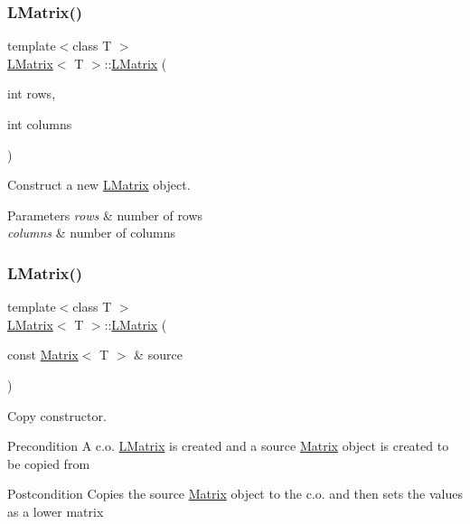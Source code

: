 \subsubsection{\texorpdfstring{LMatrix()}{LMatrix()}\hspace{0.1cm}{\footnotesize\ttfamily [2/5]}}
{\footnotesize\ttfamily template$<$class T $>$ \\
\mbox{\hyperlink{class_l_matrix}{L\+Matrix}}$<$ T $>$\+::\mbox{\hyperlink{class_l_matrix}{L\+Matrix}} (\begin{DoxyParamCaption}\item[{int}]{rows,  }\item[{int}]{columns }\end{DoxyParamCaption})}



Construct a new \mbox{\hyperlink{class_l_matrix}{L\+Matrix}} object. 


\begin{DoxyParams}{Parameters}
{\em rows} & number of rows \\
\hline
{\em columns} & number of columns \\
\hline
\end{DoxyParams}
\mbox{\label{class_l_matrix_aa4bc8aa349207a09c467d958d7361b4b}} 
\subsubsection{\texorpdfstring{LMatrix()}{LMatrix()}\hspace{0.1cm}{\footnotesize\ttfamily [3/5]}}
{\footnotesize\ttfamily template$<$class T $>$ \\
\mbox{\hyperlink{class_l_matrix}{L\+Matrix}}$<$ T $>$\+::\mbox{\hyperlink{class_l_matrix}{L\+Matrix}} (\begin{DoxyParamCaption}\item[{const \mbox{\hyperlink{class_matrix}{Matrix}}$<$ T $>$ \&}]{source }\end{DoxyParamCaption})}



Copy constructor. 

\begin{DoxyPrecond}{Precondition}
A c.\+o. \mbox{\hyperlink{class_l_matrix}{L\+Matrix}} is created and a source \mbox{\hyperlink{class_matrix}{Matrix}} object is created to be copied from 
\end{DoxyPrecond}
\begin{DoxyPostcond}{Postcondition}
Copies the source \mbox{\hyperlink{class_matrix}{Matrix}} object to the c.\+o. and then sets the values as a lower matrix 
\end{DoxyPostcond}

